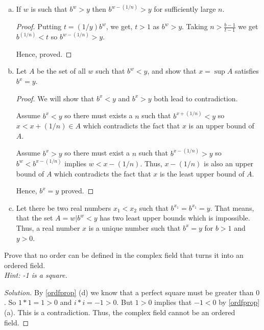 \begin{prblm}
\begin{enumerate}[(a)]
\begin{proof}
			Hence, proved.
		\end{proof}


		\item If $w$ is such that $b^w > y$ then $b^{w - (1/n)} > y$ for sufficiently large $n$.
		\begin{proof}
			Putting $t = (1/y) b^{w}$, we get, $t > 1$ as $b^w > y$.
			Taking $n > \frac{b-1}{t-1}$ we get $b^{(1/n)} < t$ so $b^{w - (1/n)} > y$.

			Hence, proved.
		\end{proof}

		\item Let $A$ be the set of all $w$ such that $b^w < y$, and show that $x = \sup A$ satisfies $b^x = y$.
		\begin{proof}
			We will show that $b^x < y$ and $b^x > y$ both lead to contradiction.

			Assume $b^x < y$ so there must exists a $n$ such that $b^{x + (1/n)} < y$
			so $x < x + (1/n) \in A$ which contradicts the fact that $x$ is an upper bound of $A$.

			Assume $b^x > y$ so there must exist a $n$ such that $b^{x - (1/n)} > y$
			so $b^w < b^{x - (1/n)}$ implies $w < x - (1/n)$. Thus, $x - (1/n)$ is also an upper bound of $A$
			which contradicts the fact that $x$ is the least upper bound of $A$.

			Hence, $b^x = y$ proved.
		\end{proof}

		\item Let there be two real numbers $x_1 < x_2$ such that $b^{x_1} = b^{x_1} = y$.
		That means, that the set $A = {w | b^w < y}$ has two least upper bounds which is impossible.
		Thus, a real number $x$ is a unique number such that $b^x = y$ for $b > 1$ and $y > 0$.
	\end{enumerate}
\end{prblm}


\begin{prblm}
	Prove that no order can be defined in the complex field that turns it into an ordered field. \\
	{\it Hint: -1 is a square.}
	\begin{proof}[Solution]
		By \ref{ordfprop} (d) we know that a perfect square must be greater than $0$.
		So $1 * 1 = 1 > 0$ and $i * i = -1 > 0$.
		But $1 > 0$ implies that $-1 < 0$ by \ref{ordfprop} (a).
		This is a contradiction. Thus, the complex field cannot be an ordered field.
	\end{proof}
\end{prblm}

